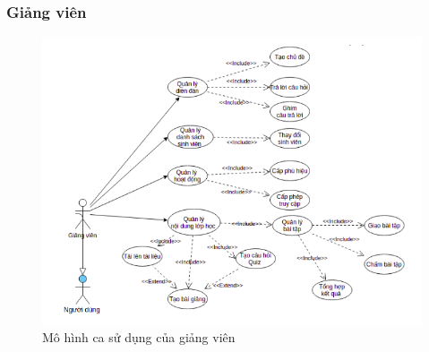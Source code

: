 \documentclass[./../main_file.tex]{subfiles}
\begin{document}
	\subsubsection{Giảng viên}
	\begin{figure}[H]
		\centering
		\includegraphics[width=\textwidth]{./images/usecaseteacher.png}
		\caption{Mô hình ca sử dụng của giảng viên}
	\end{figure}
\end{document}
